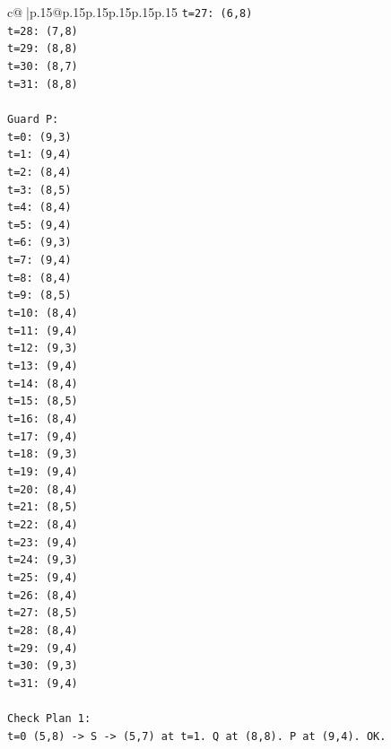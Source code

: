 \documentclass{article}
\begin{document}
{\begin{supertabular}{c@{$\;$}|p{.15\linewidth}@{}p{.15\linewidth}p{.15\linewidth}p{.15\linewidth}p{.15\linewidth}p{.15\linewidth}}
{{{\texttt{t=27: (6,8)} \\
\texttt{t=28: (7,8)} \\
\texttt{t=29: (8,8)} \\
\texttt{t=30: (8,7)} \\
\texttt{t=31: (8,8)} \\
\\ 
\texttt{Guard P:} \\
\texttt{t=0: (9,3)} \\
\texttt{t=1: (9,4)} \\
\texttt{t=2: (8,4)} \\
\texttt{t=3: (8,5)} \\
\texttt{t=4: (8,4)} \\
\texttt{t=5: (9,4)} \\
\texttt{t=6: (9,3)} \\
\texttt{t=7: (9,4)} \\
\texttt{t=8: (8,4)} \\
\texttt{t=9: (8,5)} \\
\texttt{t=10: (8,4)} \\
\texttt{t=11: (9,4)} \\
\texttt{t=12: (9,3)} \\
\texttt{t=13: (9,4)} \\
\texttt{t=14: (8,4)} \\
\texttt{t=15: (8,5)} \\
\texttt{t=16: (8,4)} \\
\texttt{t=17: (9,4)} \\
\texttt{t=18: (9,3)} \\
\texttt{t=19: (9,4)} \\
\texttt{t=20: (8,4)} \\
\texttt{t=21: (8,5)} \\
\texttt{t=22: (8,4)} \\
\texttt{t=23: (9,4)} \\
\texttt{t=24: (9,3)} \\
\texttt{t=25: (9,4)} \\
\texttt{t=26: (8,4)} \\
\texttt{t=27: (8,5)} \\
\texttt{t=28: (8,4)} \\
\texttt{t=29: (9,4)} \\
\texttt{t=30: (9,3)} \\
\texttt{t=31: (9,4)} \\
\\ 
\texttt{Check Plan 1:} \\
\texttt{t=0 (5,8) {-}> S {-}> (5,7) at t=1. Q at (8,8). P at (9,4). OK.} \\
}}}
\end{supertabular}}
\end{document}
